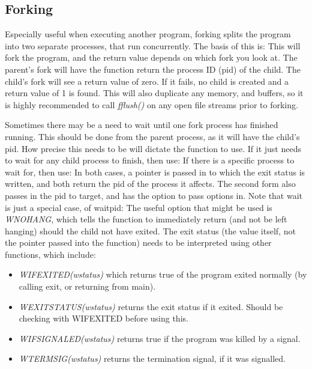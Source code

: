 \documentclass{article}
\begin{document}
\subsection{Forking}
Especially useful when executing another program, forking splits the program into two separate processes, that run concurrently. The basis of this is:
This will fork the program, and the return value depends on which fork you look at. The parent's fork will have the function return the process ID (pid) of the child. The child's fork will see a return value of zero. If it fails, no child is created and a return value of 1 is found. This will also duplicate any memory, and buffers, so it is highly recommended to call \textit{fflush()} on any open file streams prior to forking.

Sometimes there may be a need to wait until one fork process has finished running. This should be done from the parent process, as it will have the child's pid. How precise this needs to be will dictate the function to use. If it just needs to wait for any child process to finish, then use:
If there is a specific process to wait for, then use:
In both cases, a pointer is passed in to which the exit status is written, and both return the pid of the process it affects. The second form also passes in the pid to target, and has the option to pass options in. Note that wait is just a special case, of waitpid:
The useful option that might be used is \textit{WNOHANG}, which tells the function to immediately return (and not be left hanging) should the child not have exited. The exit status (the value itself, not the pointer passed into the function) needs to be interpreted using other functions, which include:
\begin{itemize}
    \item \textit{WIFEXITED(wstatus)} which returns true of the program exited normally (by calling exit, or returning from main).
    \item \textit{WEXITSTATUS(wstatus)} returns the exit status if it exited. Should be checking with WIFEXITED before using this.
    \item \textit{WIFSIGNALED(wstatus)} returns true if the program was killed by a signal.
    \item \textit{WTERMSIG(wstatus)} returns the termination signal, if it was signalled.
\end{itemize}
\end{document}
